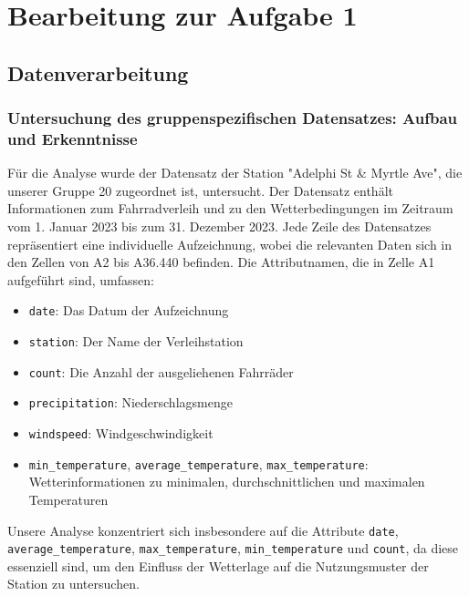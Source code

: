 \documentclass[a4paper,12pt]{article}
\begin{document}
\newpage

\section{Bearbeitung zur Aufgabe 1}

\subsection{Datenverarbeitung}
\subsubsection{Untersuchung des gruppenspezifischen Datensatzes: Aufbau und Erkenntnisse}
Für die Analyse wurde der Datensatz der Station "Adelphi St \& Myrtle Ave", die unserer Gruppe 20 zugeordnet ist, untersucht. Der Datensatz enthält Informationen zum Fahrradverleih und zu den Wetterbedingungen im Zeitraum vom 1. Januar 2023 bis zum 31. Dezember 2023.
Jede Zeile des Datensatzes repräsentiert eine individuelle Aufzeichnung, wobei die relevanten Daten sich in den Zellen von A2 bis A36.440 befinden. Die Attributnamen, die in Zelle A1 aufgeführt sind, umfassen:
\begin{itemize}
    \item \texttt{date}: Das Datum der Aufzeichnung
    \item \texttt{station}: Der Name der Verleihstation
    \item \texttt{count}: Die Anzahl der ausgeliehenen Fahrräder
    \item \texttt{precipitation}: Niederschlagsmenge
    \item \texttt{windspeed}: Windgeschwindigkeit
    \item \texttt{min\_temperature}, \texttt{average\_temperature}, \texttt{max\_temperature}: Wetterinformationen zu minimalen, durchschnittlichen und maximalen Temperaturen
\end{itemize}
Unsere Analyse konzentriert sich insbesondere auf die Attribute \texttt{date}, \texttt{average\_temperature}, \texttt{max\_temperature}, \texttt{min\_temperature} und \texttt{count}, da diese essenziell sind, um den Einfluss der Wetterlage auf die Nutzungsmuster der Station zu untersuchen.
\end{document}
